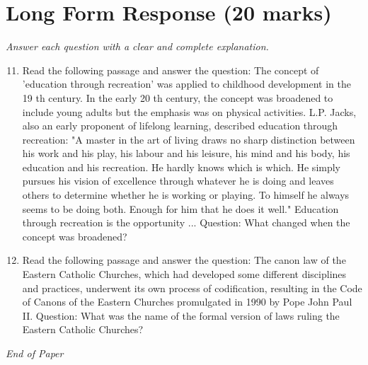 \documentclass[12pt]{article}
\begin{document}
\section*{Long Form Response (20 marks)}
\textit{Answer each question with a clear and complete explanation.}
\begin{enumerate}[label=\arabic*.]
\setcounter{enumi}{10}
\item Read the following passage and answer the question: The concept of 'education through recreation' was applied to childhood development in the 19 th century. In the early 20 th century, the concept was broadened to include young adults but the emphasis was on physical activities. L.P. Jacks, also an early proponent of lifelong learning, described education through recreation: "A master in the art of living draws no sharp distinction between his work and his play, his labour and his leisure, his mind and his body, his education and his recreation. He hardly knows which is which. He simply pursues his vision of excellence through whatever he is doing and leaves others to determine whether he is working or playing. To himself he always seems to be doing both. Enough for him that he does it well." Education through recreation is the opportunity ... Question: What changed when the concept was broadened?
\item Read the following passage and answer the question: The canon law of the Eastern Catholic Churches, which had developed some different disciplines and practices, underwent its own process of codification, resulting in the Code of Canons of the Eastern Churches promulgated in 1990 by Pope John Paul II. Question: What was the name of the formal version of laws ruling the Eastern Catholic Churches?
\end{enumerate}

\vfill
\noindent\textit{End of Paper}
\end{document}
